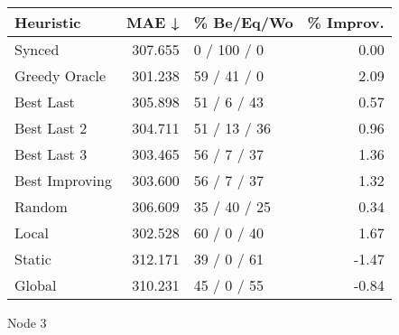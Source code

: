 \begin{tabular}{lrlr}
\toprule
\textbf{Heuristic} & \textbf{MAE ↓} & \textbf{\% Be/Eq/Wo} & \textbf{\% Improv.} \\
\midrule
            Synced &        307.655 &          0 / 100 / 0 &                0.00 \\
     Greedy Oracle &        301.238 &          59 / 41 / 0 &                2.09 \\
         Best Last &        305.898 &          51 / 6 / 43 &                0.57 \\
       Best Last 2 &        304.711 &         51 / 13 / 36 &                0.96 \\
       Best Last 3 &        303.465 &          56 / 7 / 37 &                1.36 \\
    Best Improving &        303.600 &          56 / 7 / 37 &                1.32 \\
            Random &        306.609 &         35 / 40 / 25 &                0.34 \\
             Local &        302.528 &          60 / 0 / 40 &                1.67 \\
            Static &        312.171 &          39 / 0 / 61 &               -1.47 \\
            Global &        310.231 &          45 / 0 / 55 &               -0.84 \\
\bottomrule
\end{tabular}
\caption{Node 3}
\label{tab:iid_lr05_le1_bs4_3}
